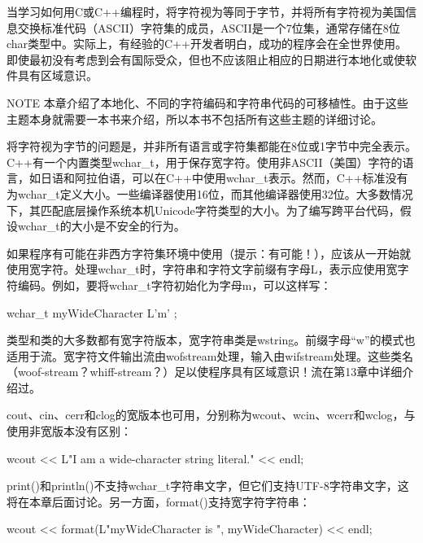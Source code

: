 
当学习如何用C或C++编程时，将字符视为等同于字节，并将所有字符视为美国信息交换标准代码（ASCII）字符集的成员，ASCII是一个7位集，通常存储在8位char类型中。实际上，有经验的C++开发者明白，成功的程序会在全世界使用。即使最初没有考虑到会有国际受众，但也不应该阻止相应的日期进行本地化或使软件具有区域意识。

\begin{myNotic}{NOTE}
本章介绍了本地化、不同的字符编码和字符串代码的可移植性。由于这些主题本身就需要一本书来介绍，所以本书不包括所有这些主题的详细讨论。
\end{myNotic}


将字符视为字节的问题是，并非所有语言或字符集都能在8位或1字节中完全表示。C++有一个内置类型wchar\_t，用于保存宽字符。使用非ASCII（美国）字符的语言，如日语和阿拉伯语，可以在C++中使用wchar\_t表示。然而，C++标准没有为wchar\_t定义大小。一些编译器使用16位，而其他编译器使用32位。大多数情况下，其匹配底层操作系统本机Unicode字符类型的大小。为了编写跨平台代码，假设wchar\_t的大小是不安全的行为。

如果程序有可能在非西方字符集环境中使用（提示：有可能！），应该从一开始就使用宽字符。处理wchar\_t时，字符串和字符文字前缀有字母L，表示应使用宽字符编码。例如，要将wchar\_t字符初始化为字母m，可以这样写：

\begin{cpp}
wchar_t myWideCharacter { L'm' };
\end{cpp}

类型和类的大多数都有宽字符版本，宽字符串类是wstring。前缀字母“w”的模式也适用于流。宽字符文件输出流由wofstream处理，输入由wifstream处理。这些类名（woof-stream？whiff-stream？）足以使程序具有区域意识！流在第13章中详细介绍过。

cout、cin、cerr和clog的宽版本也可用，分别称为wcout、wcin、wcerr和wclog，与使用非宽版本没有区别：

\begin{cpp}
wcout << L"I am a wide-character string literal." << endl;
\end{cpp}

print()和println()不支持wchar\_t字符串文字，但它们支持UTF-8字符串文字，这将在本章后面讨论。另一方面，format()支持宽字符字符串：

\begin{cpp}
wcout << format(L"myWideCharacter is {}", myWideCharacter) << endl;
\end{cpp}



